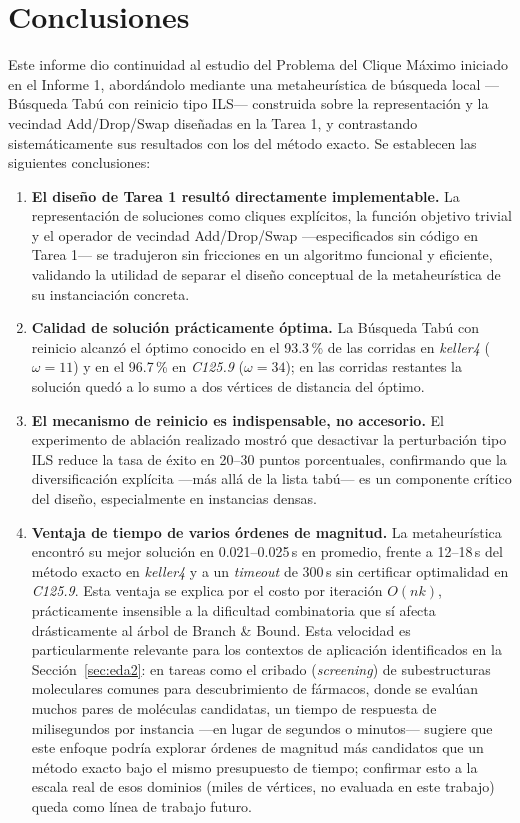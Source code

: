 \section{Conclusiones}\label{sec:conclusiones2}

Este informe dio continuidad al estudio del Problema del Clique Máximo iniciado en el Informe 1, abordándolo mediante una metaheurística de búsqueda local —Búsqueda Tabú con reinicio tipo ILS— construida sobre la representación y la vecindad Add/Drop/Swap diseñadas en la Tarea 1, y contrastando sistemáticamente sus resultados con los del método exacto. Se establecen las siguientes conclusiones:

\begin{enumerate}
    \item \textbf{El diseño de Tarea 1 resultó directamente implementable.} La representación de soluciones como cliques explícitos, la función objetivo trivial y el operador de vecindad Add/Drop/Swap —especificados sin código en Tarea 1— se tradujeron sin fricciones en un algoritmo funcional y eficiente, validando la utilidad de separar el diseño conceptual de la metaheurística de su instanciación concreta.

    \item \textbf{Calidad de solución prácticamente óptima.} La Búsqueda Tabú con reinicio alcanzó el óptimo conocido en el 93.3\,\% de las corridas en \textit{keller4} ($\omega=11$) y en el 96.7\,\% en \textit{C125.9} ($\omega=34$); en las corridas restantes la solución quedó a lo sumo a dos vértices de distancia del óptimo.

    \item \textbf{El mecanismo de reinicio es indispensable, no accesorio.} El experimento de ablación realizado mostró que desactivar la perturbación tipo ILS reduce la tasa de éxito en 20--30 puntos porcentuales, confirmando que la diversificación explícita —más allá de la lista tabú— es un componente crítico del diseño, especialmente en instancias densas.

    \item \textbf{Ventaja de tiempo de varios órdenes de magnitud.} La metaheurística encontró su mejor solución en 0.021--0.025\,s en promedio, frente a 12--18\,s del método exacto en \textit{keller4} y a un \textit{timeout} de 300\,s sin certificar optimalidad en \textit{C125.9}. Esta ventaja se explica por el costo por iteración $O(nk)$, prácticamente insensible a la dificultad combinatoria que sí afecta drásticamente al árbol de Branch \& Bound. Esta velocidad es particularmente relevante para los contextos de aplicación identificados en la Sección~\ref{sec:eda2}: en tareas como el cribado (\textit{screening}) de subestructuras moleculares comunes para descubrimiento de fármacos, donde se evalúan muchos pares de moléculas candidatas, un tiempo de respuesta de milisegundos por instancia —en lugar de segundos o minutos— sugiere que este enfoque podría explorar órdenes de magnitud más candidatos que un método exacto bajo el mismo presupuesto de tiempo; confirmar esto a la escala real de esos dominios (miles de vértices, no evaluada en este trabajo) queda como línea de trabajo futuro.


\end{enumerate}
